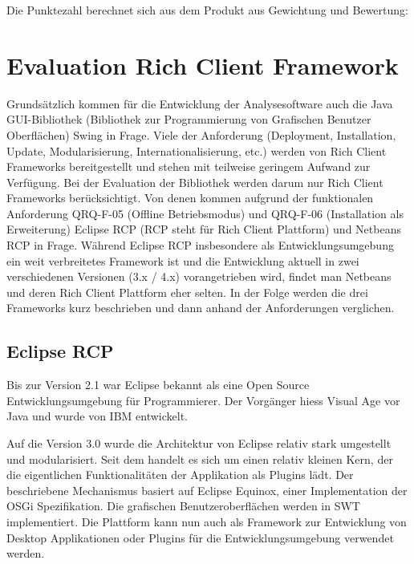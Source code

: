 Die Punktezahl berechnet sich aus dem Produkt aus Gewichtung und Bewertung:
\begin{center}
\end{center}
\section{Evaluation Rich Client Framework}
Grundsätzlich kommen für die Entwicklung der Analysesoftware auch die Java GUI-Bibliothek (Bibliothek zur Programmierung von Grafischen Benutzer Oberflächen) Swing in Frage. Viele der Anforderung (Deployment, Installation, Update, Modularisierung, Internationalisierung, etc.) werden von Rich Client Frameworks bereitgestellt und stehen mit teilweise geringem Aufwand zur Verfügung. Bei der Evaluation der Bibliothek werden darum nur Rich Client Frameworks berücksichtigt. Von denen kommen aufgrund der funktionalen Anforderung QRQ-F-05 (Offline Betriebsmodus) und QRQ-F-06 (Installation als Erweiterung) Eclipse RCP (RCP steht für Rich Client Plattform) und Netbeans RCP in Frage. Während Eclipse RCP insbesondere als Entwicklungsumgebung ein weit verbreitetes Framework ist und die Entwicklung aktuell in zwei verschiedenen Versionen (3.x / 4.x) vorangetrieben wird, findet man Netbeans und deren Rich Client Plattform eher selten. In der Folge werden die drei Frameworks kurz beschrieben und dann anhand der Anforderungen verglichen.


\subsection{Eclipse RCP}
Bis zur Version 2.1 war Eclipse bekannt als eine Open Source Entwicklungsumgebung für Programmierer. Der Vorgänger hiess Visual Age vor Java und wurde von IBM entwickelt. 

Auf die Version 3.0 wurde die Architektur von Eclipse relativ stark umgestellt und modularisiert. Seit dem handelt es sich um einen relativ kleinen Kern, der die eigentlichen Funktionalitäten der Applikation als Plugins lädt. Der beschriebene Mechanismus basiert auf Eclipse Equinox, einer Implementation der OSGi Spezifikation. Die grafischen Benutzeroberflächen werden in SWT implementiert. Die Plattform kann nun auch als Framework zur Entwicklung von Desktop Applikationen oder Plugins für die Entwicklungsumgebung  verwendet werden.

